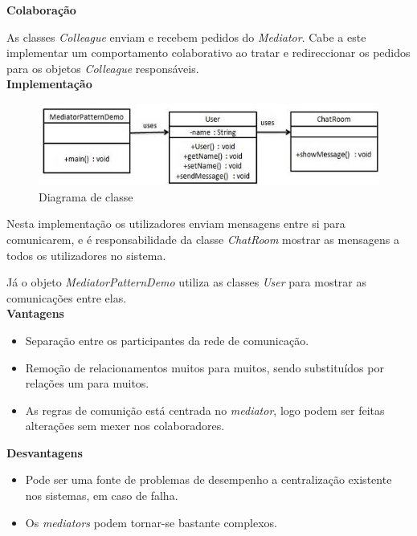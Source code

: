 \textbf{Colaboração}

As classes \textit{Colleague} enviam e recebem pedidos do \textit{Mediator}. Cabe a este implementar um comportamento colaborativo ao tratar e redireccionar os pedidos para os objetos \textit{Colleague} responsáveis.\\

\textbf{Implementação}

\begin{figure}[!h]
\centering
\includegraphics[scale=0.7]{img/mediator_diagrama}
\caption{Diagrama de classe}
\end{figure}

Nesta implementação os utilizadores enviam mensagens entre si para comunicarem, e é responsabilidade da classe \textit{ChatRoom} mostrar as mensagens a todos os utilizadores no sistema.

Já o objeto \textit{MediatorPatternDemo} utiliza as classes \textit{User} para mostrar as comunicações entre elas.\\


\textbf{Vantagens}

\begin{itemize}
  \item Separação entre os participantes da rede de comunicação.
  \item Remoção de relacionamentos muitos para muitos, sendo substituídos por relações um para muitos.
  \item As regras de comunição está centrada no \textit{mediator}, logo podem ser feitas alterações sem mexer nos colaboradores.\\
\end{itemize}

\textbf{Desvantagens}

\begin{itemize}
  \item Pode ser uma fonte de problemas de desempenho a centralização existente nos sistemas, em caso de falha.
  \item Os \textit{mediators} podem tornar-se bastante complexos.
\end{itemize}

